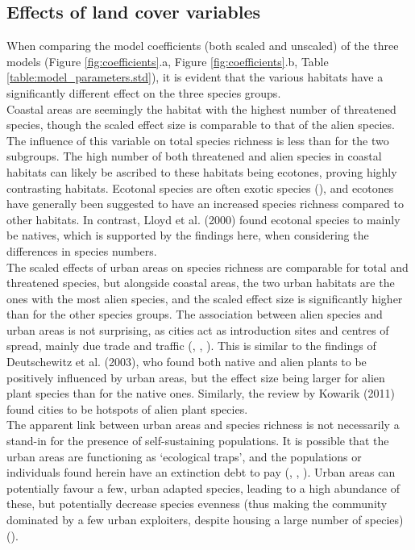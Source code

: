 \documentclass{article}
\begin{document}
\subsection{Effects of land cover variables}
When comparing the model coefficients (both scaled and unscaled) of the three models (Figure \ref{fig:coefficients}.a, Figure \ref{fig:coefficients}.b, Table \ref{table:model_parameters.std}), it is evident that the various habitats have a significantly different effect on the three species groups.\\
Coastal areas are seemingly the habitat with the highest number of threatened species, though the scaled effect size is comparable to that of the alien species. The influence of this variable on total species richness is less than for the two subgroups.
The high number of both threatened and alien species in coastal habitats can likely be ascribed to these habitats being ecotones, proving highly contrasting habitats. Ecotonal species are often exotic species (\cite{Walker2003}), and ecotones have generally been suggested to have an increased species richness compared to other habitats. In contrast, Lloyd et al. (2000) found ecotonal species to mainly be natives, which is supported by the findings here, when considering the differences in species numbers.\\
The scaled effects of urban areas on species richness are comparable for total and threatened species, but alongside coastal areas, the two urban habitats are the ones with the most alien species, and the scaled effect size is significantly higher than for the other species groups.
The association between alien species and urban areas is not surprising, as cities act as introduction sites and centres of spread, mainly due trade and traffic (\cite{Pysek1998}, \cite{Francis2015}, \cite{Padayachee2017}).
This is similar to the findings of Deutschewitz et al. (2003), who found both native and alien plants to be positively influenced by urban areas, but the effect size being larger for alien plant species than for the native ones. Similarly, the review by Kowarik (2011) found cities to be hotspots of alien plant species.\\
The apparent link between urban areas and species richness is not necessarily a stand-in for the presence of self-sustaining populations. It is possible that the urban areas are functioning as `ecological traps', and the populations or individuals found herein have an extinction debt to pay (\cite{Blair1996}, \cite{McKinney2002}, \cite{Kowarik2011}). Urban areas can potentially favour a few, urban adapted species, leading to a high abundance of these, but potentially decrease species evenness (thus making the community dominated by a few urban exploiters, despite housing a large number of species) (\cite{Turrini2015a}).\\
\end{document}
